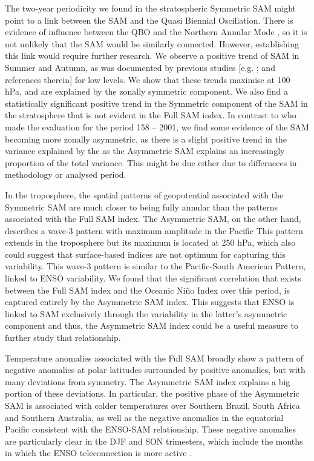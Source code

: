\documentclass[smallextended]{svjour3}       %
\begin{document}
The two-year periodicity we found in the stratospheric Symmetric SAM might point to a link between the SAM and the Quasi Biennial Oscillation. There is evidence of influence between the QBO and the Northern Annular Mode \citep[e.g.][]{holton1980, watson2014, zhang2020}, so it is not unlikely that the SAM would be similarly connected. However, establishing this link would require further research.
We observe a positive trend of SAM in Summer and Autumn, as was documented by previous studies {[}e.g. \citet{fogt2020}; and references therein{]} for low levels. We show that these trends maximise at 100 hPa, and are explained by the zonally symmetric component. We also find a statistically significant positive trend in the Symmetric component of the SAM in the stratosphere that is not evident in the Full SAM index. In contrast to \citet{fogt2012} who made the evaluation for the period 158 -- 2001, we find some evidence of the SAM becoming more zonally asymmetric, as there is a slight positive trend in the variance explained by the as the Asymmetric SAM explains an increasingly proportion of the total variance. This might be due either due to differneces in methodology or analysed period.

In the troposphere, the spatial patterns of geopotential associated with the Symmetric SAM are much closer to being fully annular than the patterns associated with the Full SAM index. The Asymmetric SAM, on the other hand, describes a wave-3 pattern with maximum amplitude in the Pacific This pattern extends in the troposphere but its maximum is located at 250 hPa, which also could suggest that surface-based indices are not optimum for capturing this variability. This wave-3 pattern is similar to the Pacific-South American Pattern, linked to ENSO variability. We found that the significant correlation that exists between the Full SAM index and the Oceanic Niño Index over this period, is captured entirely by the Asymmetric SAM index. This suggests that ENSO is linked to SAM exclusively through the variability in the latter's asymmetric component and thus, the Asymmetric SAM index could be a useful measure to further study that relationship.

Temperature anomalies associated with the Full SAM broadly show a pattern of negative anomalies at polar latitudes surrounded by positive anomalies, but with many deviations from symmetry. The Asymmetric SAM index explains a big portion of these deviations. In particular, the positive phase of the Asymmetric SAM is associated with colder temperatures over Southern Brazil, South Africa and Southern Australia, as well as the negative anomalies in the equatorial Pacific consistent with the ENSO-SAM relationship. These negative anomalies are particularly clear in the DJF and SON trimesters, which include the months in which the ENSO teleconnection is more active \citep[e.g.][]{cai2020a}.
\end{document}
